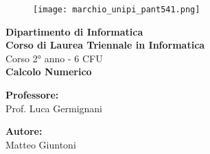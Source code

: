 \begin{titlepage} %
\begin{figure}[t] %
    \centering\texttt{[image: marchio\_unipi\_pant541.png]}
\end{figure}
\vspace{20mm}

\begin{Large}
 \begin{center}
	\textbf{Dipartimento di Informatica\\ Corso di Laurea Triennale in Informatica\\}
	\vspace{20mm}
    {\LARGE{Corso 2° anno - 6 CFU}}\\
	\vspace{10mm}
	{\huge{\bf Calcolo Numerico}}\\
\end{center}
\end{Large}


\vspace{36mm}
\begin{minipage}[t]{0.47\textwidth}
	{\large{\bf Professore:}\\ \large{Prof. Luca Germignani}}
\end{minipage}
\hfill
\begin{minipage}[t]{0.47\textwidth}\raggedleft
	{\large{\bf Autore:}\\ \large{Matteo Giuntoni}}
\end{minipage}

\vspace{25mm}

\hrulefill

\vspace{5mm}


\end{titlepage}